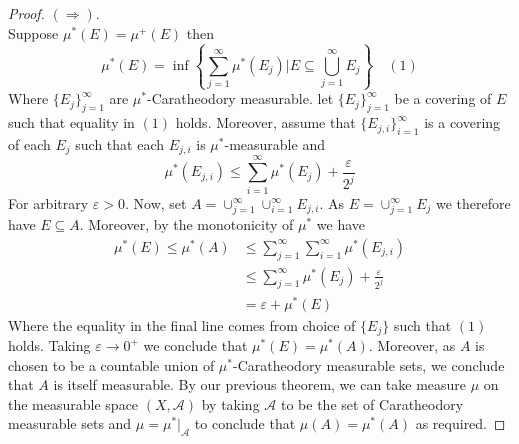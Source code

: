\documentclass[nocolor]{report}
\begin{document}
\begin{proof} $(\Rightarrow)$. \\
Suppose $\mu^*(E) = \mu^+(E)$ then 
$$\mu^*(E) =  \inf\left\{ \sum_{j=1}^{\infty}\mu^*(E_j)  \big| E\subseteq\bigcup_{j=1}^{\infty}E_j\right\} \quad (1)$$
Where $\{E_j\}_{j=1}^{\infty}$ are $\mu^*$-Caratheodory measurable. let $\{E_j\}_{j=1}^{\infty}$ be a covering of $E$ such that equality in $(1)$ holds. Moreover, assume that $\{E_{j, i}\}_{i=1}^{\infty}$ is a covering of each $E_j$ such that each $E_{j, i}$ is $\mu^*$-measurable and 
$$\mu^*(E_{j, i}) \leq \sum_{i=1}^{\infty} \mu^*(E_j) +\frac{\varepsilon}{2^j}$$
For arbitrary $\varepsilon>0$. Now, set $A = \cup_{j=1}^{\infty}\cup_{i=1}^{\infty}E_{j, i}$. As $E = \cup_{j=1}^{\infty}E_j$ we therefore have $E\subseteq A$. Moreover, by the monotonicity of $\mu^*$ we have 
\begin{align*}
    \mu^*(E) \leq \mu^*(A) &\leq \sum_{j=1}^{\infty}\sum_{i=1}^{\infty}\mu^*(E_{j,i}) \\
    &\leq \sum_{j=1}^{\infty} \mu^*(E_j) +\frac{\varepsilon}{2^j} \\
    &= \varepsilon + \mu^*(E)
\end{align*}
Where the equality in the final line comes from choice of $\{E_j\}$ such that $(1)$ holds. Taking $\varepsilon\rightarrow0^+$ we conclude that $\mu^*(E) = \mu^*(A)$. Moreover, as $A$ is chosen to be a countable union of $\mu^*$-Caratheodory measurable sets, we conclude that $A$ is itself measurable. By our previous theorem, we can take measure $\mu$ on the measurable space $(X,\mathcal{A})$ by taking $\mathcal{A}$ to be the set of Caratheodory measurable sets and $\mu = \mu^* |_{\mathcal{A}}$ to conclude that $\mu(A) = \mu^*(A)$ as required.  
\end{proof}
\end{document}
